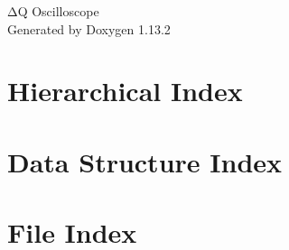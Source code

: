 \documentclass[twoside]{book}
\newcommand{\+}{\discretionary{\mbox{\scriptsize$\hookleftarrow$}}{}{}}
\newcommand{\clearemptydoublepage}{%
    \newpage{\pagestyle{empty}\cleardoublepage}%
  }
\begin{document}
  \raggedbottom
    \hypersetup{pageanchor=false,
                bookmarksnumbered=true,
                pdfencoding=unicode
               }
  \begin{titlepage}
  \vspace*{7cm}
  \begin{center}%
  {\Large Δ\+Q Oscilloscope}\\
  \vspace*{1cm}
  {\large Generated by Doxygen 1.13.2}\\
  \end{center}
  \end{titlepage}
  \clearemptydoublepage
  \tableofcontents
  \clearemptydoublepage
  \hypersetup{pageanchor=true}

\chapter{Hierarchical Index}

\chapter{Data Structure Index}

\chapter{File Index}

\end{document}
